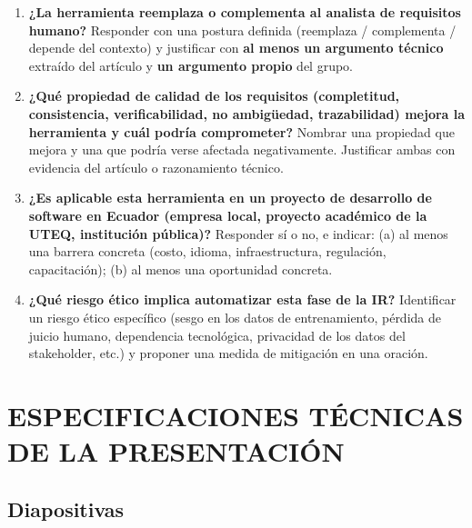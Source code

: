\documentclass[11pt,a4paper]{article}
\begin{document}
	\begin{enumerate}[leftmargin=18pt, itemsep=6pt, label=\textbf{P\arabic*.}]
		\item \textbf{¿La herramienta reemplaza o complementa al analista de requisitos humano?} Responder con una postura definida (reemplaza / complementa / depende del contexto) y justificar con \textbf{al menos un argumento técnico} extraído del artículo y \textbf{un argumento propio} del grupo.
		
		\item \textbf{¿Qué propiedad de calidad de los requisitos (completitud, consistencia, verificabilidad, no ambigüedad, trazabilidad) mejora la herramienta y cuál podría comprometer?} Nombrar una propiedad que mejora y una que podría verse afectada negativamente. Justificar ambas con evidencia del artículo o razonamiento técnico.
		
		\item \textbf{¿Es aplicable esta herramienta en un proyecto de desarrollo de software en Ecuador (empresa local, proyecto académico de la UTEQ, institución pública)?} Responder sí o no, e indicar: (a) al menos una barrera concreta (costo, idioma, infraestructura, regulación, capacitación); (b) al menos una oportunidad concreta.
		
		\item \textbf{¿Qué riesgo ético implica automatizar esta fase de la IR?} Identificar un riesgo ético específico (sesgo en los datos de entrenamiento, pérdida de juicio humano, dependencia tecnológica, privacidad de los datos del stakeholder, etc.) y proponer una medida de mitigación en una oración.
	\end{enumerate}
	
	\section{ESPECIFICACIONES TÉCNICAS DE LA PRESENTACIÓN}
	
	\subsection{Diapositivas}
	
\end{document}
